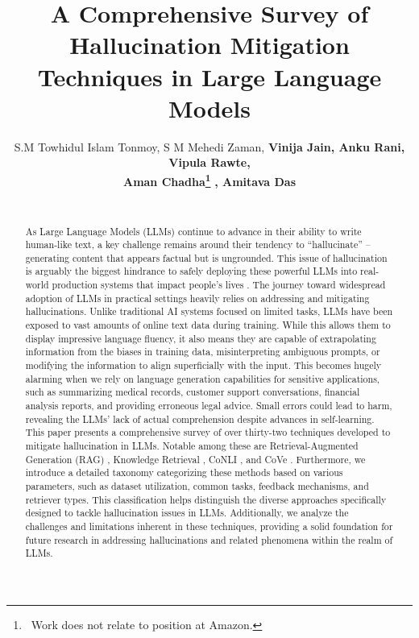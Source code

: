 \documentclass[11pt]{article}
\title{A Comprehensive Survey of Hallucination Mitigation Techniques in Large Language Models}
\author{
S.M Towhidul Islam Tonmoy\affmark[1], S M Mehedi Zaman\affmark[1], \bf{Vinija Jain\affmark[3,4]}\footnotemark[1], Anku Rani\affmark[2], Vipula Rawte\affmark[2], \\
 \bf{Aman Chadha\affmark[3,4]}\thanks{\,\,\,Work does not relate to position at Amazon.}\,\,, \bf{Amitava Das\affmark[2]}  \\
\affaddr{\affmark[1]Islamic University of Technology, Bangladesh \\
\affmark[2]AI Institute, University of South Carolina, USA \\
\affmark[3]Stanford University, USA, 
\affmark[4]Amazon AI, USA}\\
\email{towhidulislam@iut-dhaka.edu}
}
\begin{document}
\maketitle
\begin{abstract}
As Large Language Models (LLMs) continue to advance in their ability to write human-like text, a key challenge remains around their tendency to ``hallucinate'' -- generating content that appears factual but is ungrounded. This issue of hallucination is arguably the biggest hindrance to safely deploying these powerful LLMs into real-world production systems that impact people's lives \cite{Jain2023HallucinationMitigation}. The journey toward widespread adoption of LLMs in practical settings heavily relies on addressing and mitigating hallucinations. Unlike traditional AI systems focused on limited tasks, LLMs have been exposed to vast amounts of online text data during training. While this allows them to display impressive language fluency, it also means they are capable of extrapolating information from the biases in training data, misinterpreting ambiguous prompts, or modifying the information to align superficially with the input. This becomes hugely alarming when we rely on language generation capabilities for sensitive applications, such as summarizing medical records, customer support conversations, financial analysis reports, and providing erroneous legal advice. Small errors could lead to harm, revealing the LLMs' lack of actual comprehension despite advances in self-learning. This paper presents a comprehensive survey of over thirty-two techniques developed to mitigate hallucination in LLMs. Notable among these are Retrieval-Augmented Generation (RAG) \cite{lewis2021RAG}, Knowledge Retrieval \cite{varshney2023stitch}, CoNLI \cite{lei2023chain}, and CoVe \cite{dhuliawala2023chainofverification}. Furthermore, we introduce a detailed taxonomy categorizing these methods based on various parameters, such as dataset utilization, common tasks, feedback mechanisms, and retriever types. This classification helps distinguish the diverse approaches specifically designed to tackle hallucination issues in LLMs. Additionally, we analyze the challenges and limitations inherent in these techniques, providing a solid foundation for future research in addressing hallucinations and related phenomena within the realm of LLMs.
\end{abstract}
\end{document}
